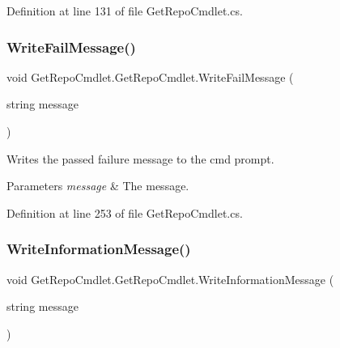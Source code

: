 Definition at line 131 of file Get\+Repo\+Cmdlet.\+cs.

\mbox{\label{class_get_repo_cmdlet_1_1_get_repo_cmdlet_afe285942efc86534f71f64c78fbb2445}} 
\subsubsection{\texorpdfstring{Write\+Fail\+Message()}{WriteFailMessage()}}
{\footnotesize\ttfamily void Get\+Repo\+Cmdlet.\+Get\+Repo\+Cmdlet.\+Write\+Fail\+Message (\begin{DoxyParamCaption}\item[{string}]{message }\end{DoxyParamCaption})\hspace{0.3cm}{\ttfamily [private]}}



Writes the passed failure message to the cmd prompt. 


\begin{DoxyParams}{Parameters}
{\em message} & The message.\\
\hline
\end{DoxyParams}


Definition at line 253 of file Get\+Repo\+Cmdlet.\+cs.

\mbox{\label{class_get_repo_cmdlet_1_1_get_repo_cmdlet_aabc925069bb0855f2cd1e07ae832b44a}} 
\subsubsection{\texorpdfstring{Write\+Information\+Message()}{WriteInformationMessage()}}
{\footnotesize\ttfamily void Get\+Repo\+Cmdlet.\+Get\+Repo\+Cmdlet.\+Write\+Information\+Message (\begin{DoxyParamCaption}\item[{string}]{message }\end{DoxyParamCaption})\hspace{0.3cm}{\ttfamily [private]}}



